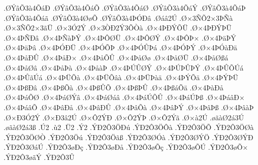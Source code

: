 {.^^d8^^dd^^e2^^d53^^e04^^d5^^e1^^d0
.^^d8^^dd^^e2^^d53^^e04^^d5^^e1^^d5
.^^d8^^dd^^e2^^d53^^e04^^d5^^e1^^d8
.^^d8^^dd^^e2^^d53^^e04^^d5^^e1^^dd
.^^d8^^dd^^e2^^d53^^e04^^d5^^e1^^de
.^^d8^^dd^^e2^^d53^^e04^^d5^^e1^^e3
.^^d8^^dd^^e2^^d53^^e04^^d8^^f8^^d5
.^^d8^^dd^^e2^^d53^^e04^^de^^d3^^d0^^e2
.^^d8^^e1^^e22^^da
.^^d8^^d73^^d1^^d52^^d73^^de^^d1^^e0
.^^d8^^d73^^d1^^d52^^d73^^e3^^dc
.^^d8^^d73^^d32^^dd
.^^d8^^d73^^d2^^d02^^dd3^^d5^^d2^^e0
.^^d8^^d74^^de^^d0^^dd^^d5^^dc
.^^d8^^d74^^de^^d0^^dd^^de^^dc
.^^d8^^d74^^de^^d1^^d0^^e2
.^^d8^^d74^^de^^d1^^e0^^de^^dd
.^^d8^^d74^^de^^d4^^d8^^dc
.^^d8^^d74^^de^^d4^^d8^^dd
.^^d8^^d74^^de^^d4^^de^^d7
.^^d8^^d74^^de^^e4^^de^^dd
.^^d8^^d74^^de^^e4^^de^^e2
.^^d8^^d74^^de^^d3^^d0^^dc
.^^d8^^d74^^de^^d3^^d5^^de
.^^d8^^d74^^de^^d3^^db^^de^^e1
.^^d8^^d74^^de^^d3^^de^^dd
.^^d8^^d74^^de^^d3^^e0^^d0^^e4
.^^d8^^d74^^de^^e5^^d0^^db
.^^d8^^d74^^de^^e5^^d0^^d7
.^^d8^^d74^^de^^e5^^d5^^db
.^^d8^^d74^^de^^e5^^d8^^f8
.^^d8^^d74^^de^^e5^^d8^^dc
.^^d8^^d74^^de^^e5^^d8^^df^^e1
.^^d8^^d74^^de^^e5^^d8^^e2
.^^d8^^d74^^de^^e5^^de^^e0
.^^d8^^d74^^de^^e5^^e0^^de
.^^d8^^d74^^de^^da^^db^^d8^^dd
.^^d8^^d74^^de^^da^^de^^db^^de^^dd
.^^d8^^d74^^de^^db^^d5^^da^^e1
.^^d8^^d74^^de^^db^^e3^^da^^e1
.^^d8^^d74^^de^^dc^^d5^^e0
.^^d8^^d74^^de^^dc^^d5^^e2^^e0
.^^d8^^d74^^de^^dc^^de^^e0^^e4
.^^d8^^d74^^de^^dd^^d5^^e4
.^^d8^^d74^^de^^dd^^de^^dc
.^^d8^^d74^^de^^df^^d0^^e2
.^^d8^^d74^^de^^df^^d5^^e0
.^^d8^^d74^^de^^df^^db^^d5
.^^d8^^d74^^de^^df^^de^^db
.^^d8^^d74^^de^^df^^e1^^d5^^e4
.^^d8^^d74^^de^^e0^^d0^^e5
.^^d8^^d74^^de^^e1^^d5^^d8
.^^d8^^d74^^de^^e1^^d8^^dd^^e2
.^^d8^^d74^^de^^e1^^d8^^e1^^e2
.^^d8^^d74^^de^^e1^^da^^d5^^db
.^^d8^^d74^^de^^e1^^da^^de^^df
.^^d8^^d74^^de^^e1^^e2^^d0^^d7
.^^d8^^d74^^de^^e1^^e2^^d5
.^^d8^^d74^^de^^e2^^d0^^e5
.^^d8^^d74^^de^^e2^^d0^^db
.^^d8^^d74^^de^^e2^^d5^^e0
.^^d8^^d74^^de^^e2^^de^^dd
.^^d8^^d74^^de^^e2^^de^^df
.^^d8^^d74^^de^^e2^^e0^^de
.^^d8^^d7^^d03^^d32^^dd
.^^d8^^d7^^d03^^e22^^da
.^^d8^^d7^^d42^^dd^^d0
.^^d8^^d7^^d42^^dd^^de
.^^d8^^d7^^d42^^dd^^e3
.^^d8^^d7^^e02^^da
.^^f8^^e3^^e0^^d82^^e13^^da
.^^f8^^e3^^e0^^d82^^e13^^df
.^^da2
.^^f92
.^^dc2
.^^dd2
.^^dd^^d02^^d43^^d6^^d0^^fa
.^^dd^^d02^^d43^^d6^^d4^^e0
.^^dd^^d02^^d43^^d6^^d5
.^^dd^^d02^^d43^^d6^^d8^^e0
.^^dd^^d02^^d43^^d6^^d8^^d2
.^^dd^^d02^^d43^^d6^^fa
.^^dd^^d02^^d43^^d6^^e3^^df
.^^dd^^d02^^d43^^d8^^d3^^e0
.^^dd^^d02^^d43^^d8^^dd^^d6
.^^dd^^d02^^d43^^d8^^dd^^d0
.^^dd^^d02^^d43^^d8^^e1^^da
.^^dd^^d02^^d43^^f8^^d0^^e7
.^^dd^^d02^^d43^^f8^^d0^^e5
.^^dd^^d02^^d43^^f8^^d5^^e7
.^^dd^^d02^^d43^^f8^^d5^^da
.^^dd^^d02^^d43^^f8^^d5^^d7
.^^dd^^d02^^d43^^f8^^e3^^dd
.^^dd^^d02^^d43^^db
}
